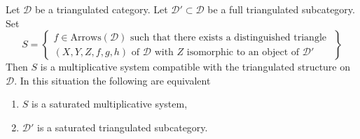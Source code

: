 \begin{lemma}
\label{lemma-construct-multiplicative-system}
Let $\mathcal{D}$ be a triangulated category.
Let $\mathcal{D}' \subset \mathcal{D}$ be a full triangulated
subcategory. Set
\begin{equation}
\label{equation-multiplicative-system}
S =
\left\{
\begin{matrix}
f \in \text{Arrows}(\mathcal{D})
\text{ such that there exists a distinguished triangle }\\
(X, Y, Z, f, g, h) \text{ of }\mathcal{D}\text{ with }
Z\text{ isomorphic to an object of }\mathcal{D}'
\end{matrix}
\right\}
\end{equation}
Then $S$ is a multiplicative system compatible with the triangulated
structure on $\mathcal{D}$. In this situation the following are equivalent
\begin{enumerate}
\item $S$ is a saturated multiplicative system,
\item $\mathcal{D}'$ is a saturated triangulated subcategory.
\end{enumerate}
\end{lemma}

